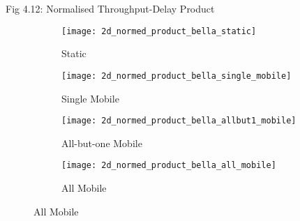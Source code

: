 \documentclass[aspectratio=43]{beamer}
\begin{document}
\begin{frame}{Fig 4.12: Normalised Throughput-Delay Product}
	\begin{figure}[h]
		\begin{subfigure}[t]{0.3\textwidth}
			\centering
			\texttt{[image: 2d\_normed\_product\_bella\_static]}
			\caption{Static}
			\label{fig:2d_normed_product_bella_static}
		\end{subfigure}
		\begin{subfigure}[t]{0.3\textwidth}
			\centering
			\texttt{[image: 2d\_normed\_product\_bella\_single\_mobile]}
			\caption{Single Mobile}
			\label{fig:2d_normed_product_bella_single_mobile}
		\end{subfigure}
		
		\begin{subfigure}[t]{0.3\textwidth}
			\centering
			\texttt{[image: 2d\_normed\_product\_bella\_allbut1\_mobile]}
			\caption{All-but-one Mobile}
			\label{fig:2d_normed_product_bella_allbut1_mobile}
		\end{subfigure}
		\begin{subfigure}[t]{0.3\textwidth}
			\centering
			\texttt{[image: 2d\_normed\_product\_bella\_all\_mobile]}
			\caption{All Mobile}
			\label{fig:2d_normed_product_bella_all_mobile}
		\end{subfigure}
		\label{fig:2d_normed_product}
	\end{figure}
\end{frame}
\end{document}
